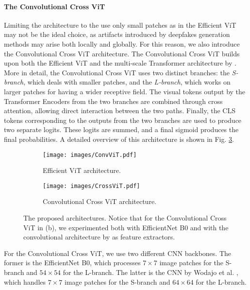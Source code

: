 \documentclass[runningheads]{llncs}
\begin{document}
\paragraph{The Convolutional Cross ViT}
Limiting the architecture to the use only small patches as in the Efficient ViT may not be the ideal choice, as artifacts introduced by deepfakes generation methods may arise both locally and globally. 
For this reason, we also introduce the Convolutional Cross ViT architecture.
The Convolutional Cross ViT builds upon both the Efficient ViT and the multi-scale Transformer architecture by \cite{chen2021crossvit}. More in detail, the Convolutional Cross ViT uses two distinct branches: the \textit{S-branch}, which deals with smaller patches, and the \textit{L-branch}, which works on larger patches for having a wider receptive field. The visual tokens output by the Transformer Encoders from the two branches are combined through cross attention, allowing direct interaction between the two paths. Finally, the CLS tokens corresponding to the outputs from the two branches are used to produce two separate logits. These logits are summed, and a final sigmoid produces the final probabilities. A detailed overview of this architecture is shown in Fig. \ref{figure:cross_vit}.\begin{figure}[t]
\begin{subfigure}[b]{0.38\textwidth}
\centering
\texttt{[image: images/ConvViT.pdf]}
\caption{Efficient ViT architecture.}
    \label{figure:vit}
\end{subfigure}
\hspace{0.5cm}
\begin{subfigure}[b]{0.5706\textwidth}
\centering
\texttt{[image: images/CrossViT.pdf]}
\caption{Convolutional Cross ViT architecture.}
\label{figure:cross_vit}
\end{subfigure}
\caption{The proposed architectures. Notice that for the Convolutional Cross ViT in (b), we experimented both with EfficientNet B0 and with the convolutional architecture by \cite{wodajo2021deepfake} as feature extractors.}
\end{figure}
For the Convolutional Cross ViT, we use two different CNN backbones. The former is the EfficientNet B0, which processes $7\times7$ image patches for the S-branch and $54\times54$ for the L-branch. The latter is the CNN by Wodajo et al. \cite{wodajo2021deepfake}, which handles $7\times7$ image patches for the S-branch and $64\times64$ for the L-branch.
\end{document}
